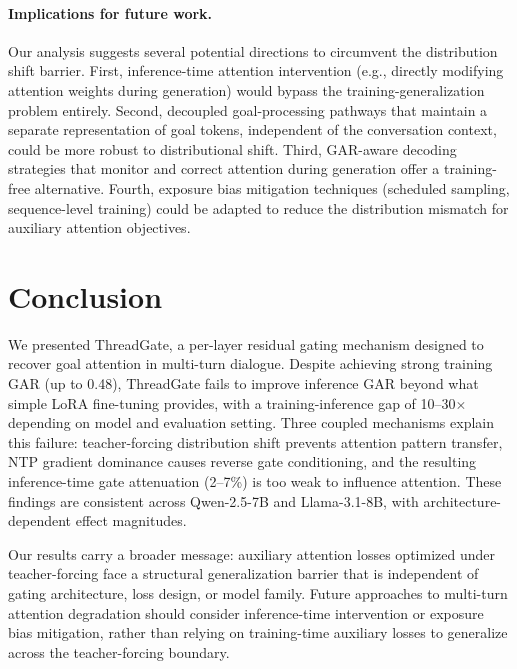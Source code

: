 \documentclass[11pt,a4paper]{article}
\begin{document}
\paragraph{Implications for future work.}
Our analysis suggests several potential directions to circumvent the distribution shift barrier.
First, inference-time attention intervention (e.g., directly modifying attention weights during generation) would bypass the training-generalization problem entirely.
Second, decoupled goal-processing pathways that maintain a separate representation of goal tokens, independent of the conversation context, could be more robust to distributional shift.
Third, GAR-aware decoding strategies that monitor and correct attention during generation offer a training-free alternative.
Fourth, exposure bias mitigation techniques (scheduled sampling, sequence-level training) could be adapted to reduce the distribution mismatch for auxiliary attention objectives.


\section{Conclusion}

We presented ThreadGate, a per-layer residual gating mechanism designed to recover goal attention in multi-turn dialogue.
Despite achieving strong training GAR (up to 0.48), ThreadGate fails to improve inference GAR beyond what simple LoRA fine-tuning provides, with a training-inference gap of 10--30$\times$ depending on model and evaluation setting.
Three coupled mechanisms explain this failure: teacher-forcing distribution shift prevents attention pattern transfer, NTP gradient dominance causes reverse gate conditioning, and the resulting inference-time gate attenuation (2--7\%) is too weak to influence attention.
These findings are consistent across Qwen-2.5-7B and Llama-3.1-8B, with architecture-dependent effect magnitudes.

Our results carry a broader message: auxiliary attention losses optimized under teacher-forcing face a structural generalization barrier that is independent of gating architecture, loss design, or model family.
Future approaches to multi-turn attention degradation should consider inference-time intervention or exposure bias mitigation, rather than relying on training-time auxiliary losses to generalize across the teacher-forcing boundary.
\end{document}
